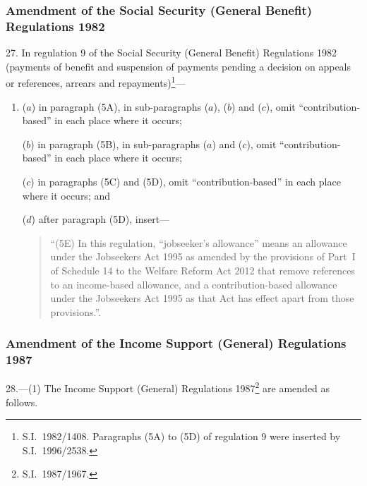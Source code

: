 \documentclass[12pt,a4paper]{article}
\begin{document}
\subsubsection[27. Amendment of the Social Security (General Benefit) Regulations 1982]{Amendment of the Social Security (General Benefit) Regulations 1982}

27.  In regulation 9 of the Social Security (General Benefit) Regulations 1982 (payments of benefit and suspension of payments pending a decision on appeals or references, arrears and repayments)\footnote{S.I.~1982/1408. Paragraphs (5A) to (5D) of regulation 9 were inserted by S.I.~1996/2538.}—
\begin{enumerate}\item[]
\begin{sloppypar}
($a$) in paragraph (5A), in sub-paragraphs ($a$), ($b$)  and ($c$), omit “contribution-based” in each place where it occurs;
\end{sloppypar}

($b$) in paragraph (5B), in sub-paragraphs ($a$)  and ($c$), omit “contribution-based” in each place where it occurs;

($c$) in paragraphs (5C) and (5D), omit “contribution-based” in each place where it occurs; and

($d$) after paragraph (5D), insert—
\begin{quotation}
“(5E) In this regulation, “jobseeker’s allowance” means an allowance under the Jobseekers Act 1995 as amended by the provisions of Part~I of Schedule 14 to the Welfare Reform Act 2012 that remove references to an income-based allowance, and a contribution-based allowance under the Jobseekers Act 1995 as that Act has effect apart from those provisions.”.
\end{quotation}
\end{enumerate}

\subsubsection[28. Amendment of the Income Support (General) Regulations 1987]{Amendment of the Income Support (General) Regulations 1987}

28.—(1) The Income Support (General) Regulations 1987\footnote{S.I.~1987/1967.} are amended as follows.
\end{document}
